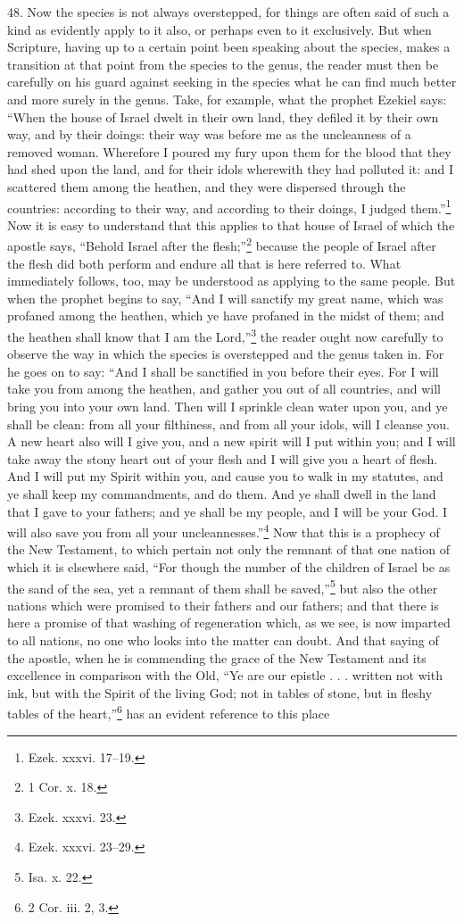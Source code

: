 48. Now the species is not always overstepped, for things are often said of such a kind as evidently apply to it also, or perhaps even to it exclusively. But when Scripture, having up to a certain point been speaking about the species, makes a transition at that point from the species to the genus, the reader must then be carefully on his guard against seeking in the species what he can find much better and more surely in the genus. Take, for example, what the prophet Ezekiel says: “When the house of Israel dwelt in their own land, they defiled it by their own way, and by their doings: their way was before me as the uncleanness of a removed woman. Wherefore I poured my fury upon them for the blood that they had shed upon the land, and for their idols wherewith they had polluted it: and I scattered them among the heathen, and they were dispersed through the countries: according to their way, and according to their doings, I judged them.”\footnote{Ezek. xxxvi. 17–19.} Now it is easy to understand that this applies to that house of Israel of which the apostle says, “Behold Israel after the flesh;”\footnote{1 Cor. x. 18.} because the people of Israel after the flesh did both perform and endure all that is here referred to. What immediately follows, too, may be understood as applying to the same people. But when the prophet begins to say, “And I will sanctify my great name, which was profaned among the heathen, which ye have profaned in the midst of them; and the heathen shall know that I am the Lord,”\footnote{Ezek. xxxvi. 23.} the reader ought now carefully to observe the way in which the species is overstepped and the genus taken in. For he goes on to say: “And I shall be sanctified in you before their eyes. For I will take you from among the heathen, and gather you out of all countries, and will bring you into your own land. Then will I sprinkle clean water upon you, and ye shall be clean: from all your filthiness, and from all your idols, will I cleanse you. A new heart also will I give you, and a new spirit will I put within you; and I will take away the stony heart out of your flesh and I will give you a heart of flesh. And I will put my Spirit within you, and cause you to walk in my statutes, and ye shall keep my commandments, and do them. And ye shall dwell in the land that I gave to your fathers; and ye shall be my people, and I will be your God. I will also save you from all your uncleannesses.”\footnote{Ezek. xxxvi. 23–29.} Now that this is a prophecy of the New Testament, to which pertain not only the remnant of that one nation of which it is elsewhere said, “For though the number of the children of Israel be as the sand of the sea, yet a remnant of them shall be saved,”\footnote{Isa. x. 22.} but also the other nations which were promised to their fathers and our fathers; and that there is here a promise of that washing of regeneration which, as we see, is now imparted to all nations, no one who looks into the matter can doubt. And that saying of the apostle, when he is commending the grace of the New Testament and its excellence in comparison with the Old, “Ye are our epistle . . . written not with ink, but with the Spirit of the living God; not in tables of stone, but in fleshy tables of the heart,”\footnote{2 Cor. iii. 2, 3.} has an evident reference to this place 